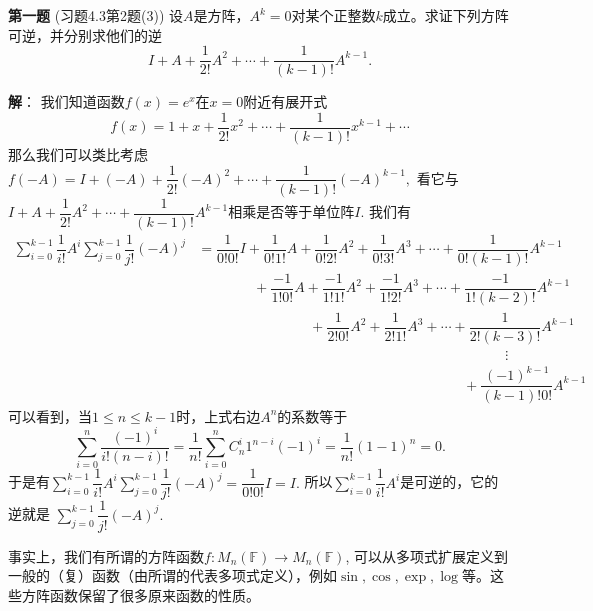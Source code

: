 
\date{2022-11-18 第六次习题课}
\author{}



\maketitle


{\bf 第一题} (习题4.3第2题(3)) 设$A$是方阵，$A^k = 0$对某个正整数$k$成立。求证下列方阵可逆，并分别求他们的逆
$$I + A + \dfrac{1}{2!}A^2 + \cdots + \dfrac{1}{(k-1)!}A^{k-1}.$$

\ifIncludeAnswer

\newpageorvspace

{\bf 解}： 我们知道函数$f(x) = e^x$在$x = 0$附近有展开式
$$f(x) = 1 + x + \dfrac{1}{2!}x^2 + \cdots + \dfrac{1}{(k-1)!}x^{k-1} + \cdots$$
那么我们可以类比考虑$f(-A) = I + (-A) + \dfrac{1}{2!}(-A)^2 + \cdots + \dfrac{1}{(k-1)!}(-A)^{k-1},$ 看它与$I + A + \dfrac{1}{2!}A^2 + \cdots + \dfrac{1}{(k-1)!}A^{k-1}$相乘是否等于单位阵$I.$ 我们有
\begin{align*}
\sum\limits_{i=0}^{k-1} \dfrac{1}{i!} A^i \sum\limits_{j=0}^{k-1} \dfrac{1}{j!} (-A)^j & = \dfrac{1}{0!0!} I + \dfrac{1}{0!1!} A + \dfrac{1}{0!2!} A^2 + \dfrac{1}{0!3!} A^3 + \cdots + \dfrac{1}{0!(k-1)!} A^{k-1} \\
& \hspace{4em} + \dfrac{-1}{1!0!} A + \dfrac{-1}{1!1!} A^2 + \dfrac{-1}{1!2!} A^3 + \cdots + \dfrac{-1}{1!(k-2)!} A^{k-1} \\
& \hspace{8em} + \dfrac{1}{2!0!} A^2 + \dfrac{1}{2!1!} A^3 + \cdots + \dfrac{1}{2!(k-3)!} A^{k-1} \\
& \hspace{22em} \vdots \\
& \hspace{19em} + \dfrac{(-1)^{k-1}}{(k-1)!0!} A^{k-1}
\end{align*}
可以看到，当$1\leqslant n \leqslant k-1$时，上式右边$A^n$的系数等于
$$\sum\limits_{i=0}^n \dfrac{(-1)^i}{i!(n-i)!} = \dfrac{1}{n!} \sum\limits_{i=0}^n C_n^i 1^{n-i} (-1)^i = \dfrac{1}{n!} (1-1)^n = 0.$$
于是有$\sum\limits_{i=0}^{k-1} \dfrac{1}{i!} A^i \sum\limits_{j=0}^{k-1} \dfrac{1}{j!} (-A)^j = \dfrac{1}{0!0!} I = I.$ 所以$\sum\limits_{i=0}^{k-1} \dfrac{1}{i!} A^i$是可逆的，它的逆就是 $\sum\limits_{j=0}^{k-1} \dfrac{1}{j!} (-A)^j.$

事实上，我们有所谓的方阵函数$f: M_n(\mathbb{F}) \to M_n(\mathbb{F})$, 可以从多项式扩展定义到一般的（复）函数（由所谓的代表多项式定义），例如$\sin, \cos, \exp, \log$等。这些方阵函数保留了很多原来函数的性质。

